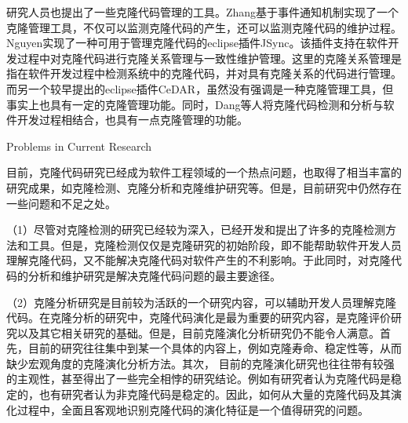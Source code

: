 研究人员也提出了一些克隆代码管理的工具。Zhang基于事件通知机制实现了一个克隆管理工具，不仅可以监测克隆代码的产生，还可以监测克隆代码的维护过程\cite{zhang2013towards}。Nguyen实现了一种可用于管理克隆代码的eclipse插件JSync\cite{nguyen2012clone}。该插件支持在软件开发过程中对克隆代码进行克隆关系管理与一致性维护管理。这里的克隆关系管理是指在软件开发过程中检测系统中的克隆代码，并对具有克隆关系的代码进行管理。
而另一个较早提出的eclipse插件CeDAR\cite{tairas2012increasing,tairas2010representation}，虽然没有强调是一种克隆管理工具，但事实上也具有一定的克隆管理功能。同时，Dang等人将克隆代码检测和分析与软件开发过程相结合，也具有一点克隆管理的功能\cite{dang2017transferring}。%



{Problems in Current Research}

目前，克隆代码研究已经成为软件工程领域的一个热点问题，也取得了相当丰富的研究成果，如克隆检测、克隆分析和克隆维护研究等。但是，目前研究中仍然存在一些问题和不足之处。

（1）尽管对克隆检测的研究已经较为深入，已经开发和提出了许多的克隆检测方法和工具。但是，克隆检测仅仅是克隆研究的初始阶段，即不能帮助软件开发人员理解克隆代码，又不能解决克隆代码对软件产生的不利影响。于此同时，对克隆代码的分析和维护研究是解决克隆代码问题的最主要途径。

（2）克隆分析研究是目前较为活跃的一个研究内容，可以辅助开发人员理解克隆代码。在克隆分析的研究中，克隆代码演化是最为重要的研究内容，是克隆评价研究以及其它相关研究的基础。但是，目前克隆演化分析研究仍不能令人满意。首先，目前的研究往往集中到某一个具体的内容上，例如克隆寿命、稳定性等，从而缺少宏观角度的克隆演化分析方法。其次， 目前的克隆演化研究也往往带有较强的主观性，甚至得出了一些完全相悖的研究结论。例如有研究者认为克隆代码是稳定的，也有研究者认为非克隆代码是稳定的。因此，如何从大量的克隆代码及其演化过程中，全面且客观地识别克隆代码的演化特征是一个值得研究的问题。

